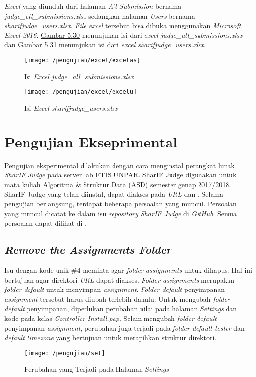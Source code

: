 	\textit{Excel} yang diunduh dari halaman \textit{All Submission} bernama \textit{judge\_all\_submissions.xlsx} sedangkan halaman \textit{Users} bernama \textit{sharifjudge\_users.xlsx}. \textit{File excel} tersebut bisa dibuka menggunakan \textit{Microsoft Excel 2016}. \hyperref[fig:excelas]{Gambar 5.30} menunjukan isi dari \textit{excel judge\_all\_submissions.xlsx} dan \hyperref[fig:excelu]{Gambar 5.31} menunjukan isi dari \textit{excel sharifjudge\_users.xlsx}.
	\begin{figure}[H]
		\centering  
		\texttt{[image: /pengujian/excel/excelas]}  
		\caption[Isi \textit{Excel judge\_all\_submissions.xlsx}]{Isi \textit{Excel judge\_all\_submissions.xlsx}} 
		\label{fig:excelas} 
	\end{figure}

	\begin{figure}[H]
		\centering  
		\texttt{[image: /pengujian/excel/excelu]}  
		\caption[Isi \textit{Excel sharifjudge\_users.xlsx}]{Isi \textit{Excel sharifjudge\_users.xlsx}} 
		\label{fig:excelu} 
	\end{figure}
	
\section{Pengujian Ekseprimental}
Pengujian eksperimental dilakukan dengan cara menginstal perangkat lunak \textit{SharIF Judge} pada server lab FTIS UNPAR. SharIF Judge digunakan untuk mata kuliah Algoritma \& Struktur Data (ASD) semester genap 2017/2018. SharIF Judge yang telah diinstal, dapat diakses pada \textit{URL}  dan . Selama pengujian berlangsung, terdapat beberapa persoalan yang muncul. Persoalan yang muncul dicatat ke dalam isu \textit{repository SharIF Judge} di \textit{GitHub}. Semua persoalan dapat dilihat di .

	\subsection{\textit{Remove the Assignments Folder}}
	Isu dengan kode unik \#4 meminta agar \textit{folder assignments} untuk dihapus. Hal ini bertujuan agar direktori \textit{URL}  dapat diakses. \textit{Folder assignments} merupakan \textit{folder default} untuk menyimpan \textit{assignment}. \textit{Folder default} penyimpanan \textit{assignment} tersebut harus diubah terlebih dahulu. Untuk mengubah \textit{folder default} penyimpanan, diperlukan perubahan nilai pada halaman \textit{Settings} dan kode pada kelas \textit{Controller Install.php}. Selain mengubah \textit{folder default} penyimpanan \textit{assignment}, perubahan juga terjadi pada \textit{folder default tester} dan \textit{default timezone} yang bertujuan untuk merapihkan struktur direktori.
	\begin{figure}[H]
		\centering  
		\texttt{[image: /pengujian/set]}  
		\caption[Perubahan yang Terjadi pada Halaman \textit{Settings}]{Perubahan yang Terjadi pada Halaman \textit{Settings}} 
		\label{fig:set} 
	\end{figure}
	

